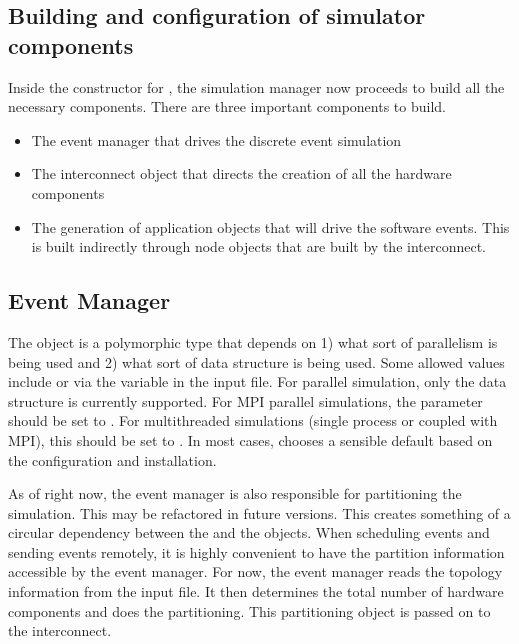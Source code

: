 \begin{enumerate}
\section{Building and configuration of simulator components}\label{sec:buildConfig}
Inside the constructor for ,
the simulation manager now proceeds to build all the necessary components.
There are three important components to build.

\begin{itemize}
\item The event manager that drives the discrete event simulation
\item The interconnect object that directs the creation of all the hardware components
\item The generation of application objects that will drive the software events. This is built indirectly through node objects that are built by the interconnect.
\end{itemize}

\subsection{Event Manager}\label{sec:eventMan}
The  object is a polymorphic type that depends on 1) what sort of parallelism is being used and 2) what sort of data structure is being used.
Some allowed values include  or  via the  variable in the input file.
For parallel simulation, only the  data structure is currently supported.
For MPI parallel simulations, the  parameter should be set to .
For multithreaded simulations (single process or coupled with MPI), this should be set to .
In most cases, \sstmacro chooses a sensible default based on the configuration and installation.

As of right now, the event manager is also responsible for partitioning the simulation.
This may be refactored in future versions.
This creates something of a circular dependency between the  and the  objects.
When scheduling events and sending events remotely,
it is highly convenient to have the partition information accessible by the event manager.
For now, the event manager reads the topology information from the input file.
It then determines the total number of hardware components and does the partitioning.
This partitioning object is passed on to the interconnect.


\end{enumerate}
